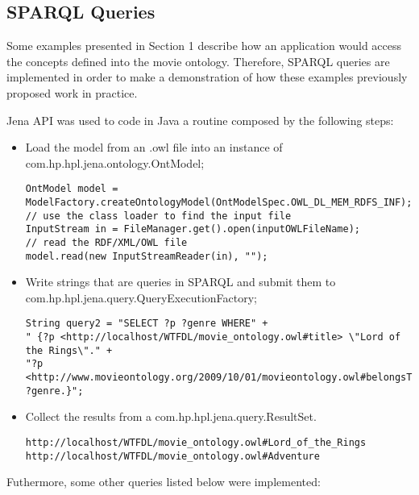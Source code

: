 \subsection{SPARQL Queries}
Some examples presented in Section 1 describe how an application would access the concepts defined into the movie ontology.
Therefore, SPARQL queries are implemented in order to make a demonstration of how these examples previously proposed work in practice.

Jena API was used to code in Java a routine composed by the following steps:

\begin{itemize}
  \item Load the model from an .owl file into an instance of com.hp.hpl.jena.ontology.OntModel;
\begin{lstlisting}
OntModel model = ModelFactory.createOntologyModel(OntModelSpec.OWL_DL_MEM_RDFS_INF);
// use the class loader to find the input file
InputStream in = FileManager.get().open(inputOWLFileName);
// read the RDF/XML/OWL file
model.read(new InputStreamReader(in), "");
\end{lstlisting}

  \item Write strings that are queries in SPARQL and submit them to com.hp.hpl.jena.query.QueryExecutionFactory;
\begin{lstlisting}
String query2 = "SELECT ?p ?genre WHERE" +
" {?p <http://localhost/WTFDL/movie_ontology.owl#title> \"Lord of the Rings\"." +
"?p <http://www.movieontology.org/2009/10/01/movieontology.owl#belongsToGenre> ?genre.}";
\end{lstlisting}

  \item Collect the results from a com.hp.hpl.jena.query.ResultSet.
\begin{lstlisting}
http://localhost/WTFDL/movie_ontology.owl#Lord_of_the_Rings
http://localhost/WTFDL/movie_ontology.owl#Adventure
\end{lstlisting}

\end{itemize}

Futhermore, some other queries listed below were implemented:

%
